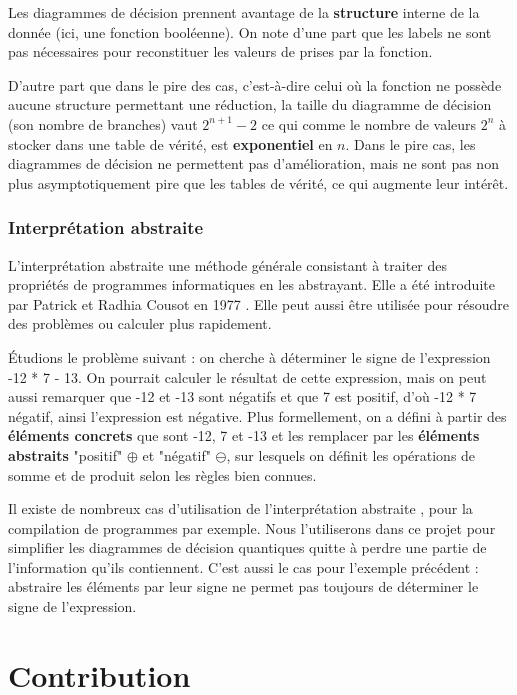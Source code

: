 Les diagrammes de décision prennent avantage de la \textbf{structure} interne de la donnée (ici, une fonction booléenne). On note d'une part que les labels ne sont pas nécessaires pour reconstituer les valeurs de prises par la fonction.

D'autre part que dans le pire des cas, c'est-à-dire celui où la fonction ne possède aucune structure permettant une réduction, la taille du diagramme de décision (son nombre de branches) vaut $2^{n+1} - 2$ ce qui comme le nombre de valeurs $2^n$ à stocker dans une table de vérité, est \textbf{exponentiel} en $n$. Dans le pire cas, les diagrammes de décision ne permettent pas d'amélioration, mais ne sont pas non plus asymptotiquement pire que les tables de vérité, ce qui augmente leur intérêt.

\subsubsection*{Interprétation abstraite}


L'interprétation abstraite une méthode générale consistant à traiter des propriétés de programmes informatiques en les abstrayant. Elle a été introduite par Patrick et Radhia Cousot en 1977 \cite{CousotCousot77-1}. Elle peut aussi être utilisée pour résoudre des problèmes ou calculer plus rapidement.

Étudions le problème suivant : on cherche à déterminer le signe de  l'expression -12 * 7 - 13. On pourrait calculer le résultat de cette expression, mais on peut aussi remarquer que -12 et -13 sont négatifs et que 7 est positif, d'où -12 * 7 négatif, ainsi l'expression est négative. Plus formellement, on a défini à partir des \textbf{éléments concrets} que sont -12, 7 et -13 et les remplacer par les \textbf{éléments abstraits} "positif" $\oplus$ et "négatif" $\ominus$, sur lesquels on définit les opérations de somme et de produit selon les règles bien connues.

Il existe de nombreux cas d'utilisation de l'interprétation abstraite \cite{Rosendahl_1995}, pour la compilation de programmes par exemple. Nous l'utiliserons dans ce projet pour simplifier les diagrammes de décision quantiques quitte à perdre une partie de l'information qu'ils contiennent. C'est aussi le cas pour l'exemple précédent : abstraire les éléments par leur signe ne permet pas toujours de déterminer le signe de l'expression.


\section{Contribution}
\label{sec:Contribution}


